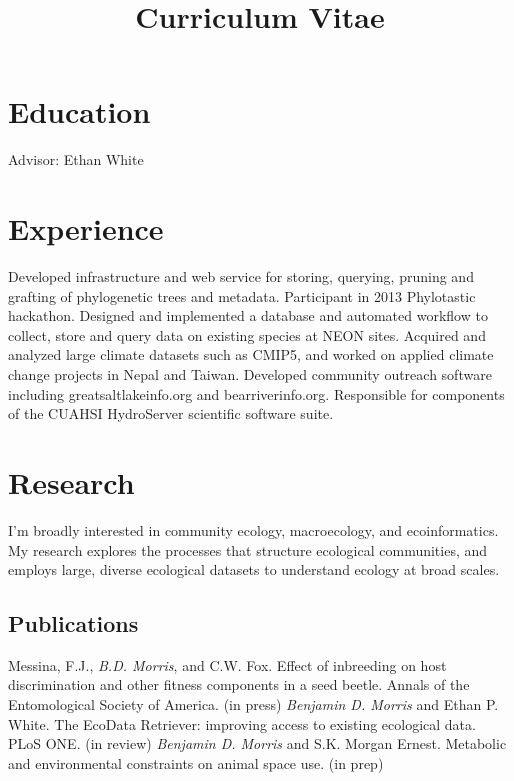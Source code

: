 \documentclass[11pt,letter]{moderncv}
\title{Curriculum Vitae}
\begin{document}
\maketitle


\section{Education}
 {Advisor: Ethan White}


\section{Experience}
{Developed infrastructure and web service for storing, querying, pruning and grafting of phylogenetic trees and metadata. Participant in 2013 Phylotastic hackathon.}
{Designed and implemented a database and automated workflow to collect, store and query data on existing species at NEON sites.}
{Acquired and analyzed large climate datasets such as CMIP5, and worked on applied climate change projects in Nepal and Taiwan.}
{Developed community outreach software including greatsaltlakeinfo.org and bearriverinfo.org. Responsible for components of the CUAHSI HydroServer scientific software suite.}


\section{Research}
\cvline{}
{I'm broadly interested in community ecology, macroecology, and ecoinformatics. My research explores the processes that structure ecological communities, and employs large, diverse ecological datasets to understand ecology at broad scales.}


\subsection{Publications}
 {
    Messina, F.J., \emph{B.D. Morris}, and C.W. Fox. Effect of inbreeding on host discrimination and other fitness components in a seed beetle. Annals of the Entomological Society of America. (in press)
}
\cvline{} {
    \emph{Benjamin D. Morris} and Ethan P. White. The EcoData Retriever: improving access to existing ecological data. PLoS ONE. (in review)
}
\cvline{} {
    \emph{Benjamin D. Morris} and S.K. Morgan Ernest. Metabolic and environmental constraints on animal space use. (in prep)
}
\end{document}
